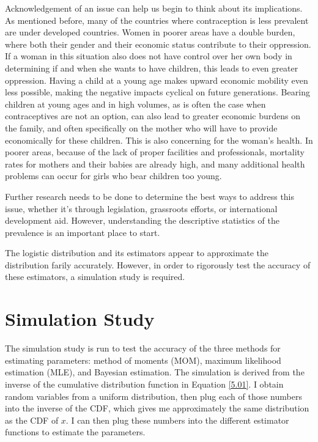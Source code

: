 \documentclass{svproc}
\begin{document}
Acknowledgement of an issue can help us begin to think about its implications. As mentioned before, many of the countries where contraception is less prevalent are under developed countries. Women in poorer areas have a double burden, where both their gender and their economic status contribute to their oppression. If a woman in this situation also does not have control over her own body in determining if and when she wants to have children, this leads to even greater oppression. Having a child at a young age makes upward economic mobility even less possible, making the negative impacts cyclical on future generations. Bearing children at young ages and in high volumes, as is often the case when contraceptives are not an option, can also lead to greater economic burdens on the family, and often specifically on the mother who will have to provide economically for these children. This is also concerning for the woman's health. In poorer areas, because of the lack of proper facilities and professionals, mortality rates for mothers and their babies are already high, and many additional health problems can occur for girls who bear children too young.

Further research needs to be done to determine the best ways to address this issue, whether it's through legislation, grassroots efforts, or international development aid. However, understanding the descriptive statistics of the prevalence is an important place to start.

The logistic distribution and its estimators appear to approximate the distribution farily accurately. However, in order to rigorously test the accuracy of these estimators, a simulation study is required.

\section{Simulation Study}

The simulation study is run to test the accuracy of the three methods for estimating parameters: method of moments (MOM), maximum likelihood estimation (MLE), and Bayesian estimation. The simulation is derived from the inverse of the cumulative distribution function in Equation \ref{5.01}. I obtain random variables from a uniform distribution, then plug each of those numbers into the inverse of the CDF, which gives me approximately the same distribution as the CDF of $x$. I can then plug these numbers into the different estimator functions to estimate the parameters. 
\end{document}
